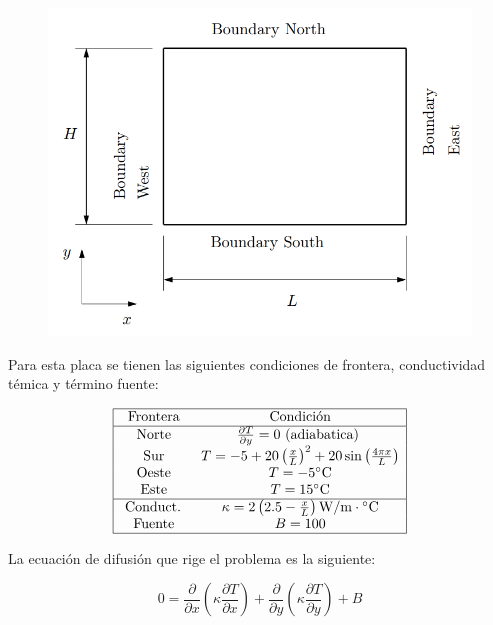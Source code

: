 \documentclass[article,latterpaper]{IEEEtran}
\begin{document}
\begin{figure}[H]
    \centering
    \includegraphics[scale=0.3]{Prob_CFD1.png}
    \caption{ }
    \label{Dom_cp}
\end{figure}

Para esta placa se tienen las siguientes condiciones de frontera, conductividad témica y término fuente:

$$
\begin{array}{|cc|}
    \hline \text { Frontera } & \text { Condición } \\
    \hline \text { Norte } & \frac{\partial T}{\partial y}=0 \text { (adiabatica) } \\
    \text { Sur } & T=-5+20\left(\frac{x}{L}\right)^2+20 \sin \left(\frac{4 \pi x}{L}\right) \\
    \text { Oeste } & T=-5^{\circ} \mathrm{C} \\
    \text { Este } & T=15^{\circ} \mathrm{C} \\
    \hline \text { Conduct. } & \kappa=2\left(2.5-\frac{x}{L}\right) \mathrm{W} / \mathrm{m} \cdot{ }^{\circ} \mathrm{C} \\
    \text { Fuente } & B=100 \\
    \hline
\end{array}
$$

La ecuación de difusión que rige el problema es la siguiente:

\begin{equation}
    0 = \frac{\partial}{\partial x} \left( \kappa \frac{\partial T}{\partial x}  \right) +  \frac{\partial}{\partial y} \left( \kappa \frac{\partial T}{\partial y}  \right) +B
    \label{Ec_difusion}      
\end{equation}
\end{document}
